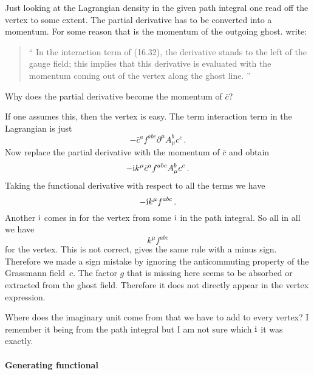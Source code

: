 \documentclass[11pt, english, fleqn, DIV=15, headinclude]{scrartcl}
\begin{document}
Just looking at the Lagrangian density in the given path integral one read off
the vertex to some extent. The partial derivative has to be converted into a
momentum. For some reason that is the momentum of the outgoing ghost.
\Textcite[514]{Peskin/QFT/1995} write:

\begin{quote}
    \enquote{%
        In the interaction term of (16.32), the derivative stands to the left
        of the gauge field; this implies that this derivative is evaluated with
        the momentum coming out of the vertex along the ghost line.%
    }
\end{quote}

\begin{table}
    \begin{question}
        Why does the partial derivative become the momentum of $\bar c$?
    \end{question}
\end{table}

If one assumes this, then the vertex is easy. The term interaction term in the
Lagrangian is just
\[
    - \bar c^a f^{abc} \partial^\mu A^b_\mu c^c \,.
\]
Now replace the partial derivative with the momentum of $\bar c$ and obtain
\[
    - \mathrm i k^\mu \bar c^a f^{abc} A^b_\mu c^c \,.
\]
Taking the functional derivative with respect to all the terms we have
\[
    - \mathrm i k^\mu f^{abc} \,.
\]
Another $\mathrm i$ comes in for the vertex from some $\mathrm i$ in the path integral.
So all in all we have
\[
    k^\mu f^{abc}
\]
for the vertex. This is not correct, \textcite[Figure~16.5]{Peskin/QFT/1995}
gives the same rule with a minus sign. Therefore we made a sign mistake by
ignoring the anticommuting property of the Grassmann field~$c$. The factor $g$
that is missing here seems to be absorbed or extracted from the ghost field.
Therefore it does not directly appear in the vertex expression.

\begin{table}
    \begin{question}
        Where does the imaginary unit come from that we have to add to every
        vertex? I remember it being from the path integral but I am not sure
        which $\mathrm i$ it was exactly.
    \end{question}
\end{table}

\paragraph{Generating functional}
\end{document}
